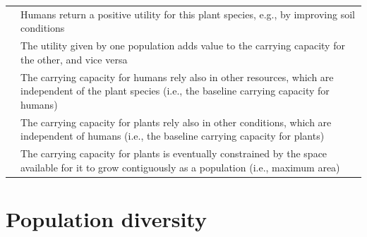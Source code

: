 \documentclass[
]{book}
\begin{document}
\begin{longtable}[]{@{}rl@{}}
\begin{minipage}[t]{0.45\columnwidth}
﻿\strut
\end{minipage} & \begin{minipage}[t]{0.49\columnwidth}\raggedright
Humans return a positive utility for this plant species, e.g., by improving soil conditions\strut
\end{minipage}\tabularnewline
\begin{minipage}[t]{0.45\columnwidth}\raggedleft
﻿\strut
\end{minipage} & \begin{minipage}[t]{0.49\columnwidth}\raggedright
The utility given by one population adds value to the carrying capacity for the other, and vice versa\strut
\end{minipage}\tabularnewline
\begin{minipage}[t]{0.45\columnwidth}\raggedleft
﻿\strut
\end{minipage} & \begin{minipage}[t]{0.49\columnwidth}\raggedright
The carrying capacity for humans rely also in other resources, which are independent of the plant species (i.e., the baseline carrying capacity for humans)\strut
\end{minipage}\tabularnewline
\begin{minipage}[t]{0.45\columnwidth}\raggedleft
﻿\strut
\end{minipage} & \begin{minipage}[t]{0.49\columnwidth}\raggedright
The carrying capacity for plants rely also in other conditions, which are independent of humans (i.e., the baseline carrying capacity for plants)\strut
\end{minipage}\tabularnewline
\begin{minipage}[t]{0.45\columnwidth}\raggedleft
﻿\strut
\end{minipage} & \begin{minipage}[t]{0.49\columnwidth}\raggedright
The carrying capacity for plants is eventually constrained by the space available for it to grow contiguously as a population (i.e., maximum area)\strut
\end{minipage}\tabularnewline
\bottomrule
\end{longtable}

\newpage

\hypertarget{population-diversity}{%
\section*{Population diversity}\label{population-diversity}}
\end{document}
